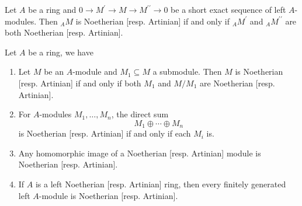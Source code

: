 \begin{theorem}
    Let $A$ be a ring and $0 \rightarrow M^\prime \xrightarrow{} M \xrightarrow{} M^{\prime\prime} \rightarrow 0$ be a short exact sequence of left $A$-modules.
    Then ${}_A M$ is Noetherian [resp. Artinian] if and only if ${}_A M^\prime$ and ${}_A M^{\prime\prime}$ are both Noetherian [resp. Artinian].
\end{theorem}


\begin{corollary}
    \label{cor: chain condition on submodules of direct sum }
    Let $A$ be a ring, we have
    \begin{enumerate}
        \item
              Let $M$ be an $A$-module and $M_1 \subseteq M$ a submodule.
              Then $M$ is Noetherian [resp. Artinian] if and only if
              both $M_1$ and $M/M_1$ are Noetherian [resp. Artinian].

        \item
              For $A$-modules $M_1,\dots,M_n$, the direct sum
              \[
                  M_1 \oplus \cdots \oplus M_n
              \]
              is Noetherian [resp. Artinian] if and only if each $M_i$ is.

        \item
              Any homomorphic image of a Noetherian [resp. Artinian] module
              is Noetherian [resp. Artinian].

        \item
              If $A$ is a left Noetherian [resp. Artinian] ring,
              then every finitely generated left $A$-module is
              Noetherian [resp. Artinian].
    \end{enumerate}
\end{corollary}









